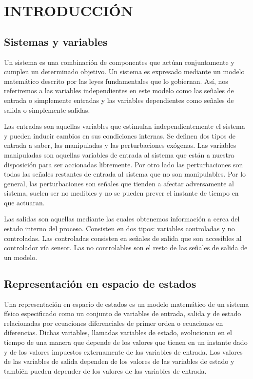 \section{\large{INTRODUCCIÓN}}
\vspace{-0.5cm}
\justifying


\subsection{\textbf{Sistemas y variables}}
\vspace{-0.5cm}
Un sistema es una combinación de componentes que actúan conjuntamente y cumplen un determinado objetivo.
Un sistema es expresado mediante un modelo matemático descrito por las leyes fundamentales que lo gobiernan. 
Así, nos referiremos a las variables independientes en este modelo como las señales de entrada o simplemente entradas 
y las variables dependientes como señales de salida o simplemente salidas.

Las entradas son aquellas variables que estimulan independientemente el sistema y pueden inducir cambios en sus condiciones internas. Se definen dos 
tipos de entrada a saber, las manipuladas y las perturbaciones exógenas. Las variables manipuladas son aquellas variables de entrada al sistema que están
a nuestra disposición para ser accionadas libremente. Por otro lado las perturbaciones son todas las señales restantes de entrada al sistema que no son 
manipulables. Por lo general, las perturbaciones son señales que tienden a afectar adversamente al sistema, suelen ser no medibles y no se pueden prever 
el instante de tiempo en que actuaran.

Las salidas son aquellas mediante las cuales obtenemos información a cerca del estado interno del proceso. Consisten en dos tipos: variables controladas 
y no controladas. Las controladas consisten en señales de salida que son accesibles al controlador vía sensor. Las no controlables son el resto de las señales 
de salida de un modelo. \parencite{ADAM}

\vspace{-0.5cm}
\subsection{\textbf{Representación en espacio de estados}}
\vspace{-0.5cm}

Una representación en espacio de estados es un modelo matemático de un sistema físico especificado como un conjunto de
variables de entrada, salida y de estado relacionadas por ecuaciones diferenciales de primer orden o ecuaciones en
diferencias. Dichas variables, llamadas variables de estado, evolucionan en el tiempo de una manera que depende
de los valores que tienen en un instante dado y de los valores impuestos externamente de las variables de entrada.
Los valores de las variables de salida dependen de los valores de las variables de estado y también pueden depender
de los valores de las variables de entrada.

